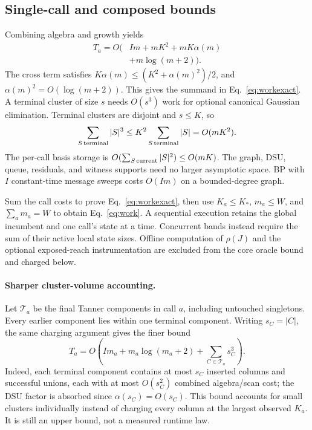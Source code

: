 \subsection{Single-call and composed bounds}
Combining algebra and growth yields
\begin{align*}
T_a=O\big(&Im+mK^2+mK\alpha(m)\\
&+m\log(m+2)\big).
\end{align*}
The cross term satisfies $K\alpha(m)\le(K^2+\alpha(m)^2)/2$, and $\alpha(m)^2=O(\log(m+2))$. This gives the summand in Eq.~\eqref{eq:workexact}. A terminal cluster of size $s$ needs $O(s^3)$ work for optional canonical Gaussian elimination. Terminal clusters are disjoint and $s\le K$, so
\begin{equation}\sum_{S\,\rm terminal}|S|^3\le K^2\sum_{S\,\rm terminal}|S|=O(mK^2).\label{eq:canonicalcost}\end{equation}
The per-call basis storage is $O(\sum_{S\,\rm current}|S|^2)\le O(mK)$. The graph, DSU, queue, residuals, and witness supports need no larger asymptotic space. BP with $I$ constant-time message sweeps costs $O(Im)$ on a bounded-degree graph.

Sum the call costs to prove Eq.~\eqref{eq:workexact}, then use $K_a\le K_*$, $m_a\le W$, and $\sum_a m_a=W$ to obtain Eq.~\eqref{eq:work}. A sequential execution retains the global incumbent and one call's state at a time. Concurrent bands instead require the sum of their active local state sizes. Offline computation of $\rho(J)$ and the optional exposed-reach instrumentation are excluded from the core oracle bound and charged below.

\paragraph{Sharper cluster-volume accounting.}
Let $\mathcal T_a$ be the final Tanner components in call $a$, including untouched singletons. Every earlier component lies within one terminal component. Writing $s_C=|C|$, the same charging argument gives the finer bound
\begin{equation}
T_a=O\!\left(Im_a+m_a\log(m_a+2)+\sum_{C\in\mathcal T_a}s_C^3\right).\label{eq:volume}
\end{equation}
Indeed, each terminal component contains at most $s_C$ inserted columns and successful unions, each with at most $O(s_C^2)$ combined algebra/scan cost; the DSU factor is absorbed since $\alpha(s_C)=O(s_C)$. This bound accounts for small clusters individually instead of charging every column at the largest observed $K_a$. It is still an upper bound, not a measured runtime law.

